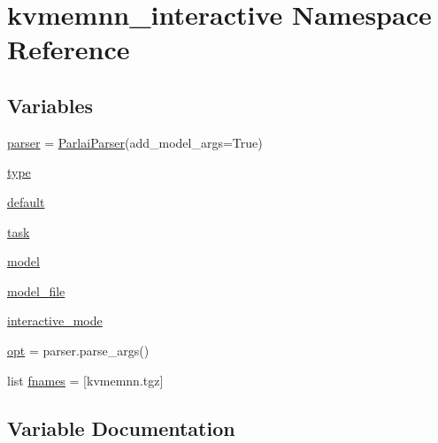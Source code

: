 \hypertarget{namespacekvmemnn__interactive}{}\section{kvmemnn\+\_\+interactive Namespace Reference}
\label{namespacekvmemnn__interactive}
\subsection*{Variables}
\begin{DoxyCompactItemize}
\item 
\hyperlink{namespacekvmemnn__interactive_a509aefa55114bb7b58ea2666dc7487ef}{parser} = \hyperlink{classparlai_1_1core_1_1params_1_1ParlaiParser}{Parlai\+Parser}(add\+\_\+model\+\_\+args=True)
\item 
\hyperlink{namespacekvmemnn__interactive_aa840d8e8b6d26c2c214c86c5d290bbfa}{type}
\item 
\hyperlink{namespacekvmemnn__interactive_a7a34ecb13d54ca798451f81d779c0ba6}{default}
\item 
\hyperlink{namespacekvmemnn__interactive_aa8471510bf27fa03c8d27edcbbbaba7c}{task}
\item 
\hyperlink{namespacekvmemnn__interactive_a2cf6201a63879bdda52299967a2e8dfc}{model}
\item 
\hyperlink{namespacekvmemnn__interactive_ad06be29cf59d016a7c21c3b343d7c1a8}{model\+\_\+file}
\item 
\hyperlink{namespacekvmemnn__interactive_a9f1547a50f62fb7b200e750530d777ca}{interactive\+\_\+mode}
\item 
\hyperlink{namespacekvmemnn__interactive_a5e6abd030a647ce7dd44c2c2f5d67688}{opt} = parser.\+parse\+\_\+args()
\item 
list \hyperlink{namespacekvmemnn__interactive_a9c385334cb0a1bed2522bc05d438a019}{fnames} = \mbox{[}\textquotesingle{}kvmemnn.\+tgz\textquotesingle{}\mbox{]}
\end{DoxyCompactItemize}


\subsection{Variable Documentation}
\mbox{\label{namespacekvmemnn__interactive_a7a34ecb13d54ca798451f81d779c0ba6}} 
